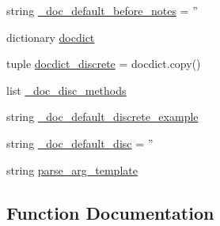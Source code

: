 \begin{DoxyCompactItemize}
\item 
string \hyperlink{namespacescipy_1_1stats_1_1__distn__infrastructure_a8c8de8a076e3990332f388e6da5297dc}{\+\_\+doc\+\_\+default\+\_\+before\+\_\+notes} = ''
\item 
dictionary \hyperlink{namespacescipy_1_1stats_1_1__distn__infrastructure_ab5f494257a7587d165ec243a92b90b57}{docdict}
\item 
tuple \hyperlink{namespacescipy_1_1stats_1_1__distn__infrastructure_a179151589849d5de65cb01f9c2a45856}{docdict\+\_\+discrete} = docdict.\+copy()
\item 
list \hyperlink{namespacescipy_1_1stats_1_1__distn__infrastructure_a28523e93291ffcce343ce53278562c9f}{\+\_\+doc\+\_\+disc\+\_\+methods}
\item 
string \hyperlink{namespacescipy_1_1stats_1_1__distn__infrastructure_a2d4c7b5e791f66a133b7ebcf49cc4f71}{\+\_\+doc\+\_\+default\+\_\+discrete\+\_\+example}
\item 
string \hyperlink{namespacescipy_1_1stats_1_1__distn__infrastructure_aaaac72b450935e3c270069fe67c3a0cb}{\+\_\+doc\+\_\+default\+\_\+disc} = ''
\item 
string \hyperlink{namespacescipy_1_1stats_1_1__distn__infrastructure_ac2177d4a1dbdfac6a0a97cfef94a72a2}{parse\+\_\+arg\+\_\+template}
\end{DoxyCompactItemize}


\subsection{Function Documentation}
\hypertarget{namespacescipy_1_1stats_1_1__distn__infrastructure_af71dbc5e912a2d0d759dea7a68f76cba}{}
